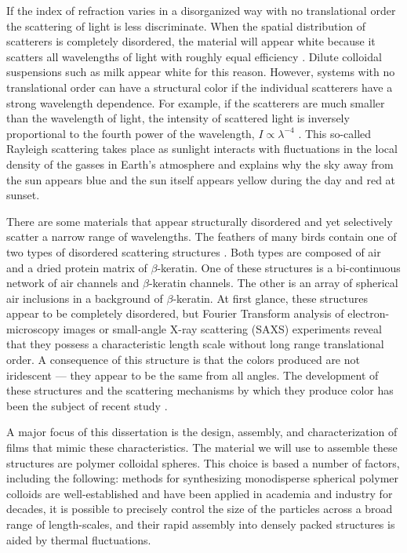 If the index of refraction varies in a disorganized way with no translational order the scattering of light is less discriminate.
When the spatial distribution of scatterers is completely disordered, the material will appear white because it scatters all wavelengths of light with roughly equal efficiency \cite{Born:1999}.
Dilute colloidal suspensions such as milk appear white for this reason.
However, systems with no translational order can have a structural color if the individual scatterers have a strong wavelength dependence.
For example, if the scatterers are much smaller than the wavelength of light, the intensity of scattered light is inversely proportional to the fourth power of the wavelength, $I\propto \lambda^{-4}$ \cite{Born:1999}.
This so-called Rayleigh scattering takes place as sunlight interacts with fluctuations in the local density of the gasses in Earth's atmosphere and explains why the sky away from the sun appears blue and the sun itself appears yellow during the day and red at sunset.

There are some materials that appear structurally disordered and yet selectively scatter a narrow range of wavelengths.
The feathers of many birds contain one of two types of disordered scattering structures \cite{Dufresne:2009p6342}. 
Both types are composed of air and a dried protein matrix of $\beta$-keratin.
One of these structures is a bi-continuous network of air channels and $\beta$-keratin channels.
The other is an array of spherical air inclusions in a background of $\beta$-keratin.
At first glance, these structures appear to be completely disordered, but Fourier Transform analysis of electron-microscopy images \cite{Prum:1998p1228} or small-angle X-ray scattering (SAXS) experiments \cite{Saranathan:2011} reveal that they possess a characteristic length scale without long range translational order.
A consequence of this structure is that the colors produced are not iridescent --- they appear to be the same from all angles.
The development of these structures and the scattering mechanisms by which they produce color has been the subject of recent study \cite{Prum:1998p1228, Dufresne:2009p6342, Prum:2009p3119, Noh:2009AM, Saranathan:2011}.

A major focus of this dissertation is the design, assembly, and characterization of films that mimic these characteristics.
The material we will use to assemble these structures are polymer colloidal spheres.
This choice is based a number of factors, including the following: methods for synthesizing monodisperse spherical polymer colloids are well-established and have been applied in academia and industry for decades, it is possible to precisely control the size of the particles across a broad range of length-scales, and their rapid assembly into densely packed structures is aided by thermal fluctuations.

